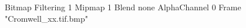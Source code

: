 {Bitmap
	{Filtering 1}
	{Mipmap 1}
	{Blend none}
	{AlphaChannel 0}
	{Frame "Cromwell_xx.tif.bmp"}
}
